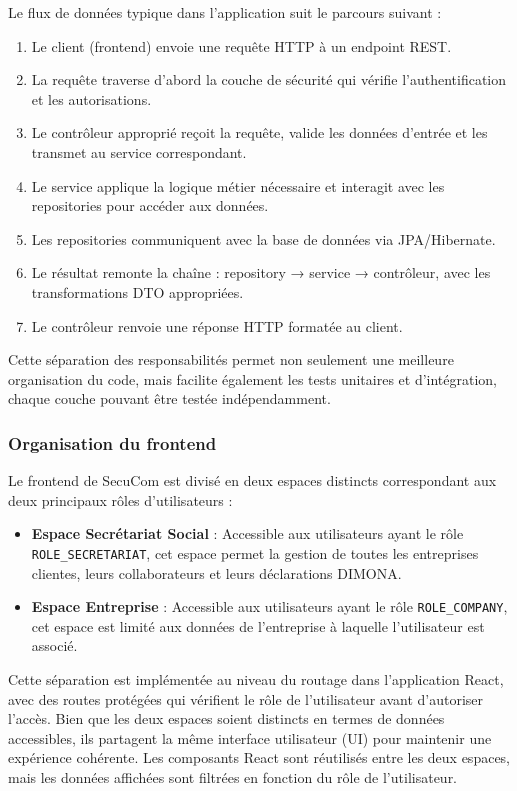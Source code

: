 Le flux de données typique dans l'application suit le parcours suivant :

\begin{enumerate}
  \item Le client (frontend) envoie une requête HTTP à un endpoint REST.
  \item La requête traverse d'abord la couche de sécurité qui vérifie l'authentification et les autorisations.
  \item Le contrôleur approprié reçoit la requête, valide les données d'entrée et les transmet au service correspondant.
  \item Le service applique la logique métier nécessaire et interagit avec les repositories pour accéder aux données.
  \item Les repositories communiquent avec la base de données via JPA/Hibernate.
  \item Le résultat remonte la chaîne : repository → service → contrôleur, avec les transformations DTO appropriées.
  \item Le contrôleur renvoie une réponse HTTP formatée au client.
\end{enumerate}

Cette séparation des responsabilités permet non seulement une meilleure organisation du code, mais facilite également les tests unitaires et d'intégration, chaque couche pouvant être testée indépendamment.

\subsubsection{Organisation du frontend}

Le frontend de SecuCom est divisé en deux espaces distincts correspondant aux deux principaux rôles d'utilisateurs :

\begin{itemize}
  \item \textbf{Espace Secrétariat Social} : Accessible aux utilisateurs ayant le rôle \texttt{ROLE\_SECRETARIAT}, cet espace permet la gestion de toutes les entreprises clientes, leurs collaborateurs et leurs déclarations DIMONA.
  \item \textbf{Espace Entreprise} : Accessible aux utilisateurs ayant le rôle \texttt{ROLE\_COMPANY}, cet espace est limité aux données de l'entreprise à laquelle l'utilisateur est associé.
\end{itemize}

Cette séparation est implémentée au niveau du routage dans l'application React, avec des routes protégées qui vérifient le rôle de l'utilisateur avant d'autoriser l'accès. Bien que les deux espaces soient distincts en termes de données accessibles, ils partagent la même interface utilisateur (UI) pour maintenir une expérience cohérente. Les composants React sont réutilisés entre les deux espaces, mais les données affichées sont filtrées en fonction du rôle de l'utilisateur.

